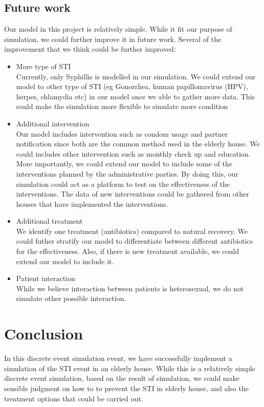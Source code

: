 \documentclass{article}
\begin{document}
\begin{normalsize}
\subsection{Future work}
Our model in this project is relatively simple. While it fit our purpose of simulation, we could further improve it in future work.
Several of the improvement that we think could be further improved:
\begin{itemize}
	\item More type of STI\\
	Currently, only Syphillis is modelled in our simulation. We could extend our model to other type of STI (eg Gonorrhea, human papillomavirus (HPV), herpes, chlamydia etc) in our model once we able to gather more data. This could make the simulation more flexible to simulate more condition
	\item Additional intervention\\
	Our  model includes intervention such as condom usage and partner notification since both are the common method used in the elderly house. We could includes other intervention such as monthly check up and education. More importantly, we could extend our model to include some of the interventions planned by the administrative parties. By doing this, our simulation could act as a platform to test on the effectiveness of the interventions. The data of new interventions could be gathered from other houses that have implemented the interventions.
	\item Additional treatment\\
	We identify one treatment (antibiotics) compared to natural recovery. We could futher stratify our model to differentiate between different antibiotics for the effectiveness. Also, if there is new treatment available, we could extend our model to include it.
	\item Patient interaction\\
	While we believe  interaction between patients is heterosexual, we do not simulate other possible interaction.
\end{itemize}

\section{Conclusion}
In this discrete event simulation event, we have successfully implement a simulation of the STI event in an elderly house. While this is a relatively simple discrete event simulation, based on the result of  simulation, we could make sensible judgment on how to to prevent the STI in elderly house, and also the treatment options that could be carried out.



\end{normalsize}
\end{document}
